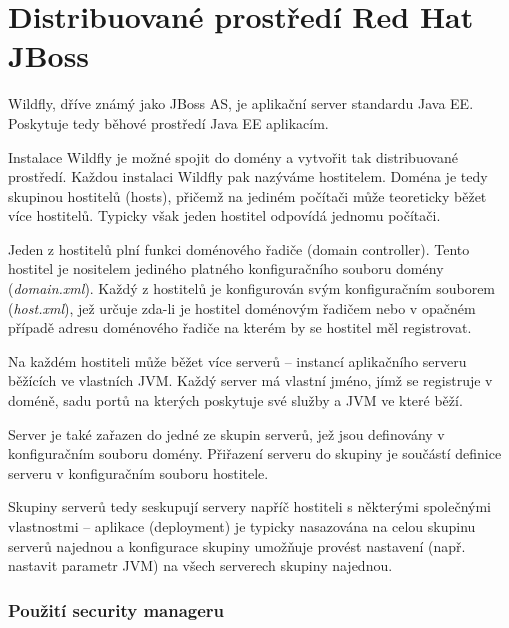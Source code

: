 \chapter{Distribuované prostředí Red Hat JBoss}

Wildfly, dříve známý jako JBoss AS, je aplikační server standardu Java EE. Poskytuje tedy běhové prostředí Java EE aplikacím.

Instalace Wildfly je možné spojit do domény a vytvořit tak distribuované prostředí. Každou instalaci Wildfly pak nazýváme hostitelem. Doména je tedy skupinou hostitelů (hosts), přičemž na jediném počítači může teoreticky běžet více hostitelů. Typicky však jeden hostitel odpovídá jednomu počítači.

Jeden z hostitelů plní funkci doménového řadiče (domain controller). Tento hostitel je nositelem jediného platného konfiguračního souboru domény ({\it domain.xml}). Každý z hostitelů je konfigurován svým konfiguračním souborem ({\it host.xml}), jež určuje zda-li je hostitel doménovým řadičem nebo v opačném případě adresu doménového řadiče na kterém by se hostitel měl registrovat. \cite{jbossDomainSetup}

Na každém hostiteli může běžet více serverů -- instancí aplikačního serveru běžících ve vlastních JVM. Každý server má vlastní jméno, jímž se registruje v doméně, sadu portů na kterých poskytuje své služby a JVM ve které běží. \cite{jbossDomainSetup}

Server je také zařazen do jedné ze skupin serverů, jež jsou definovány v konfiguračním souboru domény. Přiřazení serveru do skupiny je součástí definice serveru v konfiguračním souboru hostitele. \cite{jbossDomainSetup}

Skupiny serverů tedy seskupují servery napříč hostiteli s některými společnými vlastnostmi -- aplikace (deployment) je typicky nasazována na celou skupinu serverů najednou a konfigurace skupiny umožňuje provést nastavení (např. nastavit parametr JVM) na všech serverech skupiny najednou. \cite{jbossDomainSetup}

\subsection{Použití security manageru}

